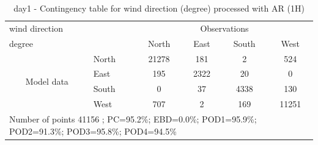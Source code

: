 \begin{table}[p!]
\begin{center}
\begin{tabular}{llcccc}
\hline
{wind direction}                                       &                                                    & \multicolumn{4}{c}{Observations}                 \\
{degree}                                       &                             & {North}   & {East} & {South} & {West} \\
\hline
\multicolumn{1}{c}{\multirow{4}{*}{Model data}}  & {North}              & 21278                & 181                       & 2              & 524\\
                                                 & {East}               & 195                & 2322                       & 20              & 0\\
                                                 & {South}              & 0                & 37                      & 4338             & 130\\
                                                 & {West}               & 707               & 2                      & 169             & 11251\\
\hline 
\multicolumn{6}{l}{ Number of points        41156 ; PC=95.2\%; EBD=0.0\%; POD1=95.9\%; POD2=91.3\%; POD3=95.8\%; POD4=94.5\%}                 \\
\end{tabular}
\end{center}
\caption{day1 - Contingency table for {wind direction} (degree) processed with AR (1H)}
\label{tab:contingencywdAFT:day1}
\end{table}
